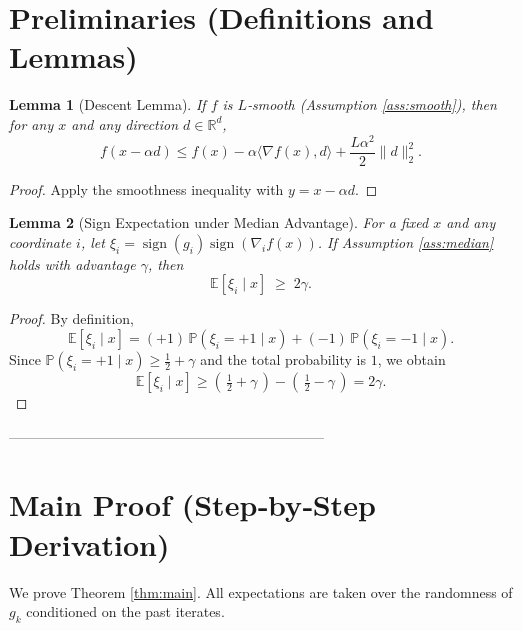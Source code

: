 \documentclass{article}
\newtheorem{lemma}{Lemma}
\newcommand{\sign}{\operatorname{sign}}
\begin{document}
\section*{Preliminaries (Definitions and Lemmas)}
\begin{lemma}[Descent Lemma]\label{lem:descent}
If $f$ is $L$‑smooth (Assumption \ref{ass:smooth}), then for any $x$ and any
direction $d\in\mathbb{R}^{d}$,
\[
f(x-\alpha d)\le f(x)-\alpha\langle\nabla f(x),d\rangle
+\frac{L\alpha^{2}}{2}\|d\|_{2}^{2}.
\]
\end{lemma}
\begin{proof}
Apply the smoothness inequality with $y=x-\alpha d$.
\end{proof}

\begin{lemma}[Sign Expectation under Median Advantage]\label{lem:signexp}
For a fixed $x$ and any coordinate $i$, let $\xi_i=\sign(g_i)\sign(\nabla_i f(x))$.
If Assumption \ref{ass:median} holds with advantage $\gamma$, then
\[
\mathbb{E}[\xi_i\mid x]\;\ge\;2\gamma .
\tag{3}
\]
\end{lemma}
\begin{proof}
By definition,
\[
\mathbb{E}[\xi_i\mid x]
= (+1)\,\mathbb{P}(\xi_i=+1\mid x)
+ (-1)\,\mathbb{P}(\xi_i=-1\mid x).
\]
Since $\mathbb{P}(\xi_i=+1\mid x)\ge\tfrac12+\gamma$ and the total
probability is $1$, we obtain
\[
\mathbb{E}[\xi_i\mid x]\ge (\,\tfrac12+\gamma\,)-(\,\tfrac12-\gamma\,)=2\gamma .
\]
\end{proof}

--------------------------------------------------------------------

\section*{Main Proof (Step‑by‑Step Derivation)}
We prove Theorem \ref{thm:main}.  All expectations are taken over the randomness
of $g_k$ conditioned on the past iterates.
\end{document}

